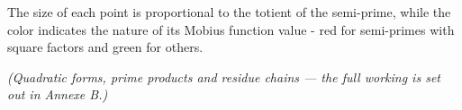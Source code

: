 The size of each point is proportional to the totient of the semi-prime, while the color indicates the nature of its Mobius function value - red for semi-primes with square factors and green for others.

\textit{(Quadratic forms, prime products and residue chains --- the full working is set out in Annexe B.)}

% 
